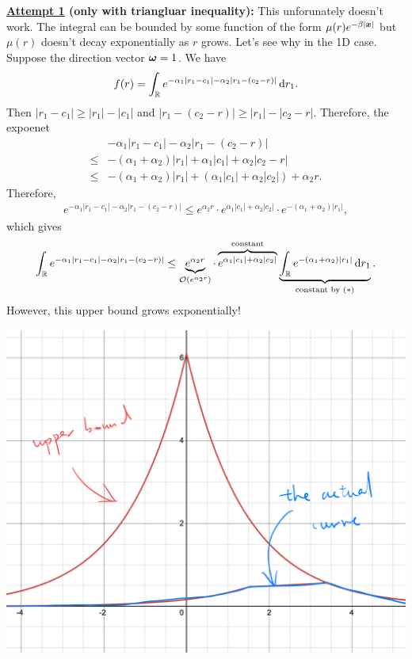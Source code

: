 \documentclass[12pt]{article}
\begin{document}
\textbf{\underline{Attempt 1} (only with triangluar inequality):} This unforunately doesn't work. The integral can be bounded by some function of the form \(\mu(r)e^{-\beta|\bm{x}|}\) but \(\mu(r)\) doesn't decay exponentially as \(r\) grows. Let's see why in the 1D case. Suppose the direction vector \(\bm{\omega} = 1\). We have
\begin{align*}
    f(r) = \int_{\mathbb {R}} e^{-\alpha_1|r_1 - c_1| - \alpha_2 |r_1 - (c_2 - r)| } \mathop{}\!\mathrm{d} r_1.
\end{align*}
Then \(|r_1 - c_1| \geq |r_1| - |c_1|\) and \(|r_1 - (c_2 - r)| \geq |r_1| - |c_2 - r|\).
Therefore, the expoenet
\begin{align*}
    &-\alpha_1|r_1 - c_1| - \alpha_2 |r_1 - (c_2 - r)| \\
    \leq& -(\alpha_1 + \alpha_2)|r_1| + \alpha_1|c_1| + \alpha_2|c_2 - r|  \\
    \leq& -(\alpha_1 + \alpha_2)|r_1| + (\alpha_1|c_1| + \alpha_2|c_2|) + \alpha_2 r.
\end{align*}
Therefore,
\begin{align*}
    e^{-\alpha_1|r_1 - c_1| - \alpha_2 |r_1 - (c_2 - r)|} \leq e^{\alpha_2 r} \cdot e^{\alpha_1|c_1| + \alpha_2|c_2|}\cdot e^{-(\alpha_1 + \alpha_2)|r_1|},
\end{align*}
which gives
\begin{align*}
    \int_{\mathbb {R}}  e^{-\alpha_1|r_1 - c_1| - \alpha_2 |r_1 - (c_2 - r)|}
    \leq 
    \underbrace{e^{\alpha_2 r}}_{\mathcal{O}(e^{\alpha_2r})}
    \cdot 
    \overbrace{e^{\alpha_1|c_1| + \alpha_2|c_2|}}^{\text{constant}} 
    \underbrace{\int_{\mathbb {R}} e^{-(\alpha_1 + \alpha_2)|r_1|} \mathop{}\!\mathrm{d} r_1}_{\text{constant by }(\ast)}.
\end{align*}
However, this upper bound grows exponentially!

\begin{center}
    \includegraphics[scale=0.2]{figure4.jpeg}
\end{center}
\end{document}
